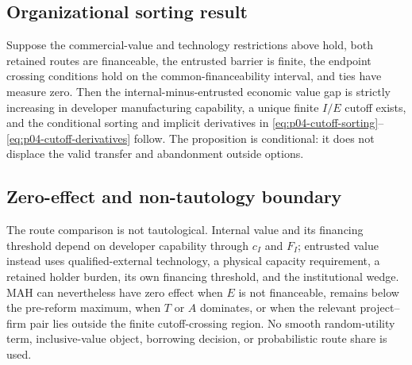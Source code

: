 \subsection{Organizational sorting result}
\label{subsec:p04-sorting-proposition}

Suppose the commercial-value and technology restrictions above hold, both
retained routes are financeable, the entrusted barrier is finite, the
endpoint crossing conditions hold on the common-financeability interval, and
ties have measure zero. Then the internal-minus-entrusted economic value gap
is strictly increasing in developer manufacturing capability, a unique finite
\(I/E\) cutoff exists, and the conditional sorting and implicit derivatives in
\eqref{eq:p04-cutoff-sorting}--\eqref{eq:p04-cutoff-derivatives} follow.
The proposition is conditional: it does not displace the valid transfer and
abandonment outside options.

\subsection{Zero-effect and non-tautology boundary}
\label{subsec:p04-zero-effect}

The route comparison is not tautological. Internal value and its financing
threshold depend on
developer capability through \(c_I\) and \(F_I\); entrusted value instead uses
qualified-external technology, a physical capacity requirement, a retained
holder burden, its own financing threshold, and the institutional wedge. MAH
can nevertheless have zero effect when \(E\) is not financeable, remains below
the pre-reform maximum, when \(T\) or \(A\) dominates, or when the relevant
project--firm pair lies outside the finite cutoff-crossing region. No smooth
random-utility term, inclusive-value object, borrowing decision, or
probabilistic route share is used.
